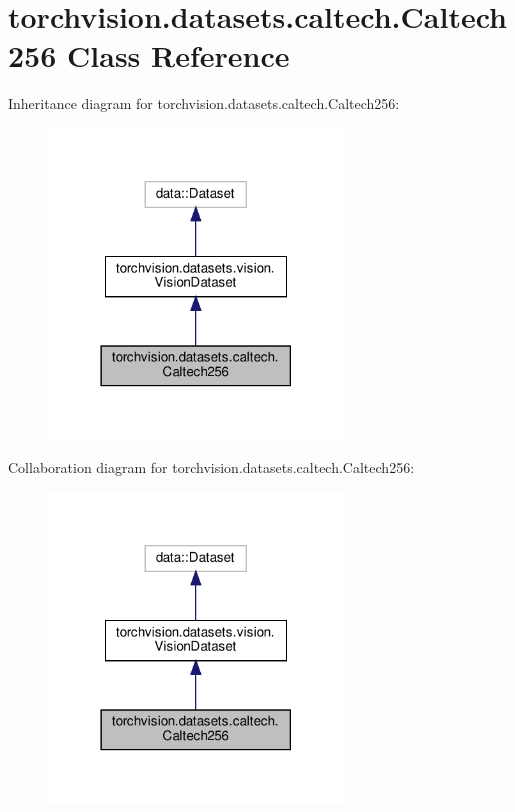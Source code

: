 \hypertarget{classtorchvision_1_1datasets_1_1caltech_1_1Caltech256}{}\section{torchvision.\+datasets.\+caltech.\+Caltech256 Class Reference}
\label{classtorchvision_1_1datasets_1_1caltech_1_1Caltech256}


Inheritance diagram for torchvision.\+datasets.\+caltech.\+Caltech256\+:
\nopagebreak
\begin{figure}[H]
\begin{center}
\leavevmode
\includegraphics[width=222pt]{classtorchvision_1_1datasets_1_1caltech_1_1Caltech256__inherit__graph}
\end{center}
\end{figure}


Collaboration diagram for torchvision.\+datasets.\+caltech.\+Caltech256\+:
\nopagebreak
\begin{figure}[H]
\begin{center}
\leavevmode
\includegraphics[width=222pt]{classtorchvision_1_1datasets_1_1caltech_1_1Caltech256__coll__graph}
\end{center}
\end{figure}
